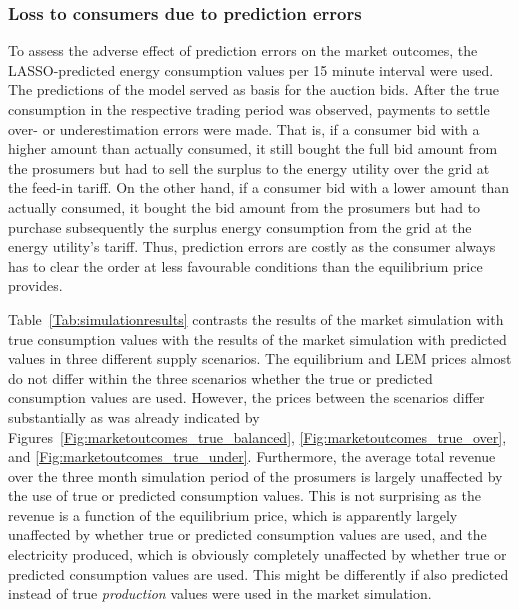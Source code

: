 \subsubsection{Loss to consumers due to prediction errors}

To assess the adverse effect of prediction errors on the market outcomes, the LASSO-predicted energy consumption values per 15 minute interval were used. The predictions of the model served as basis for the auction bids. After the true consumption in the respective trading period was observed, payments to settle over- or underestimation errors were made. That is, if a consumer bid with a higher amount than actually consumed, it still bought the full bid amount from the prosumers but had to sell the surplus to the energy utility over the grid at the feed-in tariff. On the other hand, if a consumer bid with a lower amount than actually consumed, it bought the bid amount from the prosumers but had to purchase subsequently the surplus energy consumption from the grid at the energy utility's tariff. Thus, prediction errors are costly as the consumer always has to clear the order at less favourable conditions than the equilibrium price provides.

Table~\ref{Tab:simulationresults} contrasts the results of the market simulation with true consumption values with the results of the market simulation with predicted values in three different supply scenarios. The equilibrium and LEM prices almost do not differ within the three scenarios whether the true or predicted consumption values are used. However, the prices between the scenarios differ substantially as was already indicated by Figures~\ref{Fig:marketoutcomes_true_balanced}, \ref{Fig:marketoutcomes_true_over}, and \ref{Fig:marketoutcomes_true_under}. Furthermore, the average total revenue over the three month simulation period of the prosumers is largely unaffected by the use of true or predicted consumption values. This is not surprising as the revenue is a function of the equilibrium price, which is apparently largely unaffected by whether true or predicted consumption values are used, and the electricity produced, which is obviously completely unaffected by whether true or predicted consumption values are used. This might be differently if also predicted instead of true \emph{production} values were used in the market simulation.


